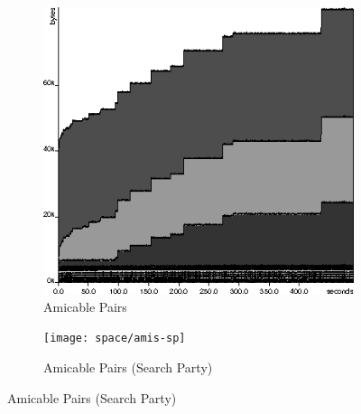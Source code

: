 \begin{figure}[t]
  \centering
  \begin{subfigure}{0.4\textwidth}
    \includegraphics[width=\textwidth]{space/amis-orig.eps}
    \caption{Amicable Pairs}
    \label{fig:examples-space:amis-orig}
  \end{subfigure}
  \begin{subfigure}{0.4\textwidth}
    \texttt{[image: space/amis-sp]}
    \caption{Amicable Pairs (Search Party)}
    \label{fig:examples-space:amis-sp}
  \end{subfigure}



\end{figure}
